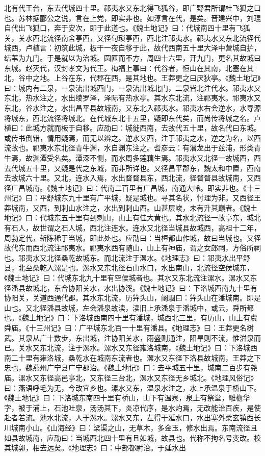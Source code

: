 \documentclass[12pt,UTF8]{ctexbook}
\begin{document}
北有代王台，东去代城四十里。祁夷水又东北得飞狐谷，即广野君所谓杜飞狐之口也。苏林据郦公之说，言在上党，即实非也。如淳言在代，是矣。晋建兴中，刘琨自代出飞狐口，奔于安次，即于此道也。《魏土地记》曰：代城南四十里有飞狐关，关水西北流径南舍亭西，又径句琐亭西，西北注祁夷水。祁夷水又东北流径代城西，卢植言：初筑此城，板干一夜自移于此，故代西南五十里大泽中营城自护，结苇为九门。于是就以为治城。圆匝而不方，周四十六里，开九门，更名其故城曰东城。赵灭代，汉封孝文为代王。梅福上事曰：代谷者，恒山在其南，北塞在其北，谷中之地。上谷在东，代郡在西，是其地也。王莽更之曰厌狄亭。《魏土地记》曰：城内有二泉，一泉流出城西门，一泉流出城北门，二泉皆北注代水。祁夷水又东北，热水注之，水出绫罗泽，泽际有热水亭。其水东北流，注祁夷水。祁夷水又东北，谷水注之，水出昌平县故城南，又东北入祁夷水。祁夷水右会逆水，水导源将城东，西北流径将城北。在代城东北十五里，疑即东代矣，而尚传将城之名。卢植曰：此城方就而板于自移。应劭曰：城徙西南，去故代五十里，故名代曰东城。或传书倒错，情用疑焉，而无以辨之。逆水又西，注于祁夷之水，逆之为名，以西流故也。祁夷水东北径青牛渊，水自渊东注之。耆彦云：有潜龙出于兹浦，形类青牛焉，故渊潭受名矣。潭深不恻，而水周多莲藕生焉。祁夷水又北径一故城西，西去代城五十里，又疑是代之东城，而非所详也。又径昌平郡东，魏太和中置，西南去故城六十里。又北，连水入焉，水出瞀瞀县东，西北流，径瞀瞀县故城南，又西径广昌城南。《魏土地记》曰：代南二百里有广昌城，南通大岭。即实非也。《十三州记》曰：平舒城东九十里有广平城，疑是城也。寻其名状，忖理为非。又西径王莽城南，又西，到刺山水注之，水出到刺山西。山甚层峻，未有升其巅者。《魏土地记》曰：代城东五十里有到刺山，山上有佳大黄也。其水北流径一故亭东，城北有石人，故世谓之石人城，西北注连水。连水又北径当城县故城西，高祖十二年，周勃定代，斩陈稀于当城，即此处也。应劭曰：当桓都山作城，故曰当城也。又径故代东而西北流注祁夷水。祁夷水西有随山，山上有神庙，谓之女郎祠，方俗所祠也。祁夷水又北径桑乾故城东。而北流注于漯水。《地理志》曰：祁夷水出平舒县，北至桑乾入漯是也。漯水又东北径石山水口，水出南山，北流径空侯城东，《魏土地记》曰：代城东北九十里有空侯城者也。其水又东北流注漯水。漯水又东径潘县故城北，东合协阳关水，水出协溪。《魏土地记》曰：下洛城西南九十里有协阳关，关道西通代郡。其水东北流，历笄头山，阚駰曰：笄头山在潘城南。即是山也。又北径潘县故城，左会潘泉故渎，渎旧上承潘泉于潘城中，或云，舜所都也。《魏土地记》曰：下洛城西南四十里有潘城，城西北三里，有历山，山上有虞舜庙。《十三州记》曰：广平城东北百一十里有潘县。《地理志》曰：王莽更名树武。其泉从广十数步，东出城，注协阳关水，雨盛则通注，阳旱则不流，惟洴泉而已。关水又东北流，注于漯水。漯水又东径雍洛城南，《魏土地记》曰：下洛城西南二十里有雍洛城，桑乾水在城南东流者也。漯水又东径下洛县故城南，王莽之下忠也，魏燕州广宁县广宁郡治。《魏土地记》曰：去平城五十里，城南二百步有尧庙。漯水又东径高邑亭北，又东径三台北，漯水又东径无乡城北。《地理风俗记》曰：燕语呼毛为无，今改宜乡也。漯水又东，温泉水注之，水上承温泉于桥山下。《魏土地记》曰：下洛城东南四十里有桥山，山下有温泉，泉上有祭堂，雕檐华字，被于浦上，石池吐泉，汤汤其下，炎凉代序，是水灼焉，无改能治百疾，是使赴者若流。池水北流，人于漯水。漯水又东，左得于延水口，水出塞外柔玄镇西长川城南小山。《山海经》曰：梁渠之山，无草木，多金玉，修水出焉。东南流径且如县故城南，应劭曰：当城西北四十里有且如城，故县也。代称不拘名号变改。校其城郭，相去远矣。《地理志》曰：中部都尉治。于延水出
\end{document}
